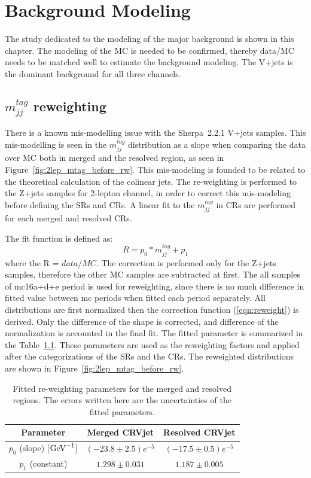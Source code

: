 \chapter{Background Modeling}
\label{chap:modeling}
The study dedicated to the modeling of the major background is shown in this chapter. 
The modeling of the MC is needed to be confirmed, thereby data/MC needs to be matched well to estimate the background modeling.
The V+jets is the dominant background for all three channels. 

\section{$m_{jj}^{tag}$ reweighting}
There is a known mis-modelling issue with the Sherpa~2.2.1 V+jets samples. This mis-modelling is seen in the $m^{tag}_{jj}$ distribution as a slope when comparing the data over MC both in merged and the resolved region, as seen in Figure~\ref{fig:2lep_mtag_before_rw}. 
This mis-modeling is founded to be related to the theoretical calculation of the colinear jets. 
The re-weighting is performed to the Z+jets samples for 2-lepton channel, in order to correct this mis-modeling before defining the SRs and CRs. A linear fit to the $m^{tag}_{jj}$ in CRs are performed for each merged and resolved CRs. 

The fit function is defined as:
\begin{equation}
\label{eqn:reweight}
R=p_{0} * m_{jj}^{tag}+p_{1}
\end{equation}
where the R = $data/MC$. The correction is performed only for the Z+jets samples, therefore the other MC samples are subtracted at first. The all samples of mc16a+d+e period is used for reweighting, since there is no much difference in fitted value between mc periods when fitted each period separately. All distributions are first normalized then the correction function (\ref{eqn:reweight}) is derived. Only the difference of the shape is corrected, and difference of the normalization is accounted in the final fit.
The fitted parameter is summarized in the Table~\ref{tab:fit}. These parameters are used as the reweighting factors and applied after the categorizations of the SRs and the CRs. The reweighted distributions are shown in Figure~\ref{fig:2lep_mtag_before_rw}.

\begin{table}[htbp]
 \footnotesize
\begin{center}
\begin{tabular}{ | c | c | c |}
\hline
Parameter & Merged CRVjet & Resolved CRVjet  \\
\hline
$p_{0}$ (slope) [$\mathrm{GeV}^{-1}$] & $(-23.8 \pm 2.5)e^{-5}$ &  $(-17.5 \pm 0.5)e^{-5}$ \\
 \hline
$p_{1}$ (constant)  & $1.298 \pm 0.031$ & $1.187 \pm 0.005$ \\
\hline
\end{tabular}
\caption{\label{tab:fit} Fitted re-weighting parameters for the merged and resolved regions. The errors written here are the uncertainties of the fitted parameters. }
  \end{center}
\end{table}


